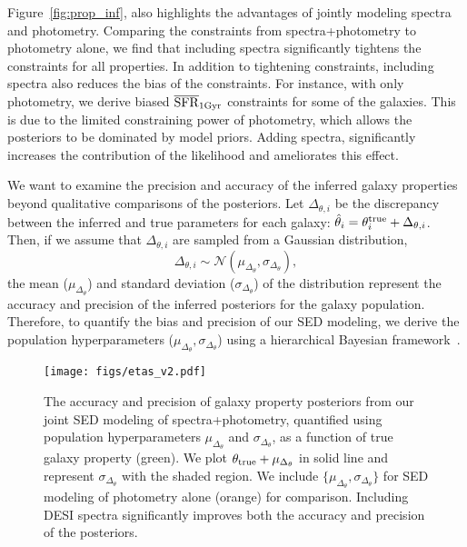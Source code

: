 Figure~\ref{fig:prop_inf}, also highlights the advantages of jointly modeling
spectra and photometry. 
Comparing the constraints from spectra+photometry to photometry alone, we find
that including spectra significantly tightens the constraints for all
properties. 
In addition to tightening constraints, including spectra also reduces the bias
of the constraints. 
For instance, with only photometry, we derive biased $\overline{\rm SFR}_{\rm 1Gyr}$ constraints for
some of the galaxies. 
This is due to the limited constraining power of photometry, which allows the
posteriors to be dominated by model priors. 
Adding spectra, significantly increases the contribution of the likelihood and
ameliorates this effect. 

We want to examine the precision and accuracy of the inferred galaxy properties
beyond qualitative comparisons of the posteriors. 
Let $\Delta_{\theta,i}$ be the discrepancy between the inferred and true
parameters for each galaxy: $\hat{\theta}_i = \theta^{\rm true}_i +
\Delta_{\theta,i}$.
Then, if we assume that $\Delta_{\theta,i}$ are sampled from a Gaussian
distribution,
\begin{equation} \label{eq:eta_gauss}
    \Delta_{\theta,i} \sim \mathcal{N}(\mu_{\Delta_{\theta}}, \sigma_{\Delta_{\theta}}),
\end{equation}
the mean ($\mu_{\Delta_{\theta}}$) and standard deviation
($\sigma_{\Delta_{\theta}}$) of the distribution represent the accuracy and
precision of the inferred posteriors for the galaxy population. 
Therefore, to quantify the bias and precision of our SED modeling, we derive the 
population hyperparameters ($\mu_{\Delta_{\theta}}, \sigma_{\Delta_{\theta}}$)
using a hierarchical Bayesian framework~\citep[\emph{e.g.}][]{hogg2010,
foreman-mackey2014, baronchelli2020}.


\begin{figure}
\begin{center}
    \texttt{[image: figs/etas\_v2.pdf]} \label{fig:etas}
    \caption{
        The accuracy and precision of galaxy property posteriors from our
        joint SED modeling of spectra+photometry, quantified using population
        hyperparameters $\mu_{\Delta_{\theta}}$ and $\sigma_{\Delta_{\theta}}$,
        as a function of true galaxy property (green). 
        We plot $\theta_{\rm true} + \mu_{\Delta_{\theta}}$ in solid line and
        represent $\sigma_{\Delta_{\theta}}$ with the shaded region.
        We include $\{\mu_{\Delta_{\theta}}, \sigma_{\Delta_{\theta}}\}$ for SED
        modeling of photometry alone (orange) for comparison. 
        Including DESI spectra significantly improves both the accuracy and
        precision of the posteriors. 
    }
\end{center}
\end{figure}

